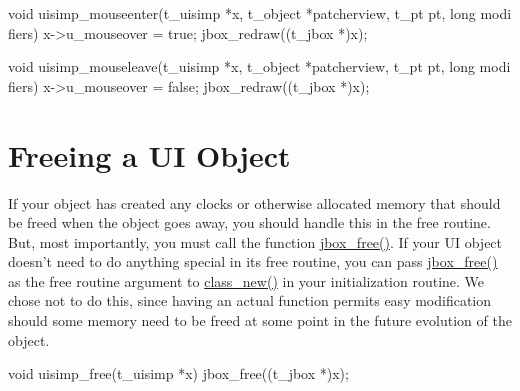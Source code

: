 \begin{DoxyCode}
    void uisimp_mouseenter(t_uisimp *x, t_object *patcherview, t_pt pt, long modi
      fiers)
    {
        x->u_mouseover = true;
        jbox_redraw((t_jbox *)x);
    }

    void uisimp_mouseleave(t_uisimp *x, t_object *patcherview, t_pt pt, long modi
      fiers)
    {
        x->u_mouseover = false;
        jbox_redraw((t_jbox *)x);
    }
\end{DoxyCode}
\hypertarget{chapter_ui_anatomy_chapter_ui_anatomy_freeing}{}\section{Freeing a UI Object}\label{chapter_ui_anatomy_chapter_ui_anatomy_freeing}
If your object has created any clocks or otherwise allocated memory that should be freed when the object goes away, you should handle this in the free routine. But, most importantly, you must call the function \hyperlink{group__jbox_ga769cbf2dd8ebf22ac21e9df271c61704}{jbox\_\-free()}. If your UI object doesn't need to do anything special in its free routine, you can pass \hyperlink{group__jbox_ga769cbf2dd8ebf22ac21e9df271c61704}{jbox\_\-free()} as the free routine argument to \hyperlink{group__class_ga238696d466081965c2b72b3880358404}{class\_\-new()} in your initialization routine. We chose not to do this, since having an actual function permits easy modification should some memory need to be freed at some point in the future evolution of the object.


\begin{DoxyCode}
    void uisimp_free(t_uisimp *x)
    {
        jbox_free((t_jbox *)x);
    }
\end{DoxyCode}
 